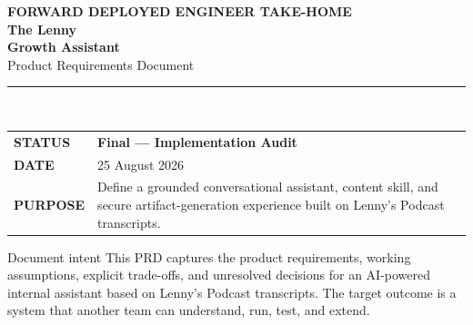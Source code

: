 \documentclass[11pt]{article}
\begin{document}
\thispagestyle{empty}

\vspace*{0.85in}
\hspace*{0.25in}\begin{minipage}{0.84\textwidth}
  {\small\bfseries\color{Teal}\MakeUppercase{Forward Deployed Engineer Take-Home}}\\[1.1em]
  {\fontsize{32}{37}\selectfont\bfseries\color{white}The Lenny\\Growth Assistant}\\[0.45em]
  {\fontsize{18}{23}\selectfont\color{white!78}Product Requirements Document}\\[2.1em]

  {\color{white!55}\rule{\linewidth}{0.5pt}}\\[1.5em]
  \begin{tabular}{@{}L{1.15in}L{3.8in}@{}}
    \color{white!55}\textbf{STATUS} & \color{white}\textbf{Final — Implementation Audit}\\
    \color{white!55}\textbf{DATE} & \color{white}25 August 2026\\
    \color{white!55}\textbf{PURPOSE} & \color{white}Define a grounded conversational assistant, content skill, and secure artifact-generation experience built on Lenny's Podcast transcripts.\\
  \end{tabular}
\end{minipage}

\vfill
{}
\newpage

\thispagestyle{plain}
\begin{principlebox}{Document intent}
This PRD captures the product requirements, working assumptions, explicit trade-offs, and unresolved decisions for an AI-powered internal assistant based on Lenny's Podcast transcripts. The target outcome is a system that another team can understand, run, test, and extend.
\end{principlebox}
\end{document}
